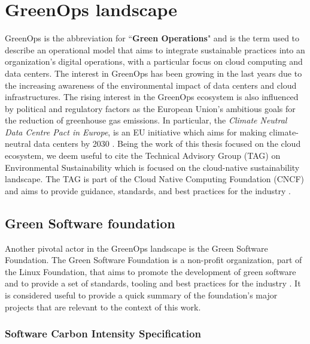 \section{GreenOps landscape}

GreenOps is the abbreviation for ``\textbf{Green Operations}" and is the term used to describe an operational model that aims to integrate sustainable practices into an organization's digital operations, with a particular focus on cloud computing and data centers.
The interest in GreenOps has been growing in the last years due to the increasing awareness of the environmental impact of data centers and cloud infrastructures.
The rising interest in the GreenOps ecosystem is also influenced by political and regulatory factors as the European Union's ambitious goals for the reduction of greenhouse gas emissions.
In particular, the \textit{Climate Neutral Data Centre Pact in Europe}, is an EU initiative which aims for making climate-neutral data centers by 2030 \cite{climate_neutral_data_centre_pact}.
Being the work of this thesis focused on the cloud ecosystem, we deem useful to cite the Technical Advisory Group (TAG) on Environmental Sustainability which is focused on the cloud-native sustainability landscape.
The TAG is part of the Cloud Native Computing Foundation (CNCF) and aims to provide guidance, standards, and best practices for the industry \cite{tag_env_sustainability}.


\subsection{Green Software foundation}

Another pivotal actor in the GreenOps landscape is the Green Software Foundation.
The Green Software Foundation is a non-profit organization, part of the Linux Foundation, that aims to promote the development of green software and to provide a set of standards, tooling and best practices for the industry \cite{green_software_foundation}.
It is considered useful to provide a quick summary of the foundation's major projects that are relevant to the context of this work.

\subsubsection{Software Carbon Intensity Specification}

